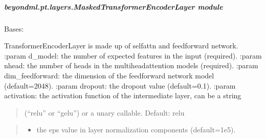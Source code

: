 \documentclass[letterpaper,10pt,english]{sphinxmanual}
\begin{document}
\subparagraph{beyondml.pt.layers.MaskedTransformerEncoderLayer module}
\label{\detokenize{beyondml.pt.layers:module-beyondml.pt.layers.MaskedTransformerEncoderLayer}}\label{\detokenize{beyondml.pt.layers:beyondml-pt-layers-maskedtransformerencoderlayer-module}}

\begin{fulllineitems}
\label{\detokenize{beyondml.pt.layers:beyondml.pt.layers.MaskedTransformerEncoderLayer.MaskedTransformerEncoderLayer}}
\pysigstartsignatures
{}
\pysigstopsignatures
\sphinxAtStartPar
Bases: 

\sphinxAtStartPar
TransformerEncoderLayer is made up of self\sphinxhyphen{}attn and feedforward network.
:param d\_model: the number of expected features in the input (required).
:param nhead: the number of heads in the multiheadattention models (required).
:param dim\_feedforward: the dimension of the feedforward network model (default=2048).
:param dropout: the dropout value (default=0.1).
:param activation: the activation function of the intermediate layer, can be a string
\begin{quote}

\sphinxAtStartPar
(“relu” or “gelu”) or a unary callable. Default: relu
\end{quote}
\begin{quote}\begin{description}
\begin{itemize}
\item {} 
\sphinxAtStartPar
{} \textendash{} the eps value in layer normalization components (default=1e\sphinxhyphen{}5).


\end{itemize}
\end{description}
\end{quote}
\end{fulllineitems}
\end{document}
